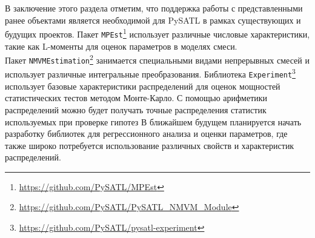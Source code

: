 В заключение этого раздела отметим, что поддержка работы с представленными ранее объектами является необходимой для PySATL в рамках существующих и будущих проектов. Пакет \texttt{MPEst}\footnote{\url{https://github.com/PySATL/MPEst}} использует различные числовые характеристики, такие как L-моменты для оценок параметров в моделях смеси.\\ Пакет \texttt{NMVMEstimation}\footnote{\url{https://github.com/PySATL/PySATL_NMVM_Module}} занимается специальными видами непрерывных смесей и использует различные интегральные преобразования. Библиотека \texttt{Experiment}\footnote{\url{https://github.com/PySATL/pysatl-experiment}} использует базовые характеристики распределений для оценок мощностей статистических тестов методом Монте-Карло. С помощью арифметики распределений можно будет получать точные распределения статистик используемых при проверке гипотез  В ближайшем будущем планируется начать разработку библиотек для регрессионного анализа и оценки параметров, где также широко потребуется использование различных свойств и характеристик распределений.
